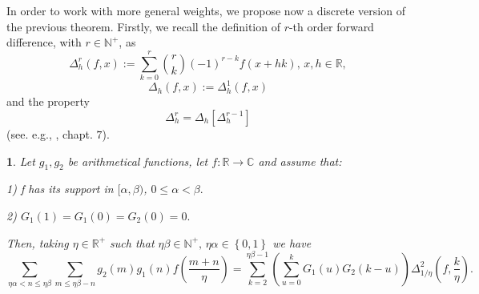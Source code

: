 \documentclass[10pt,a4paper]{amsart}
\numberwithin{equation}{section}
\numberwithin{figure}{section}
\newtheorem{thm}{\protect\theoremname}
\providecommand{\theoremname}{Theorem}
\begin{document}
In order to work with more general weights, we propose now a discrete
version of the previous theorem. Firstly, we recall the definition
of $r$-th order forward difference, with $r\in\mathbb{N}^{+}$, as
\[
\Delta_{h}^{r}\left(f,x\right):=\sum_{k=0}^{r}\binom{r}{k}\left(-1\right)^{r-k}f\left(x+hk\right),\,x,h\in\mathbb{R},
\]
\[
\Delta_{h}\left(f,x\right):=\Delta_{h}^{1}\left(f,x\right)
\]
and the property
\begin{equation}
\Delta_{h}^{r}=\Delta_{h}\left[\Delta_{h}^{r-1}\right]\label{eq:prod fow diff}
\end{equation}
(see. e.g., \cite{DVL1993}, chapt. $7$).
\begin{thm}
\label{thm:MainDiscrete}Let $g_{1},g_{2}$ be arithmetical functions,
let $f:\mathbb{R}\rightarrow\mathbb{C}$ and assume that:

1) f has its support in $[\alpha,\beta)$, $0\leq\alpha<\beta$$.$ 

2) $G_{1}(1)=G_{1}(0)=G_{2}(0)=0.$

Then, taking $\eta\in\mathbb{R}^{+}$ such that $\eta\beta\in\mathbb{N}^{+},\,\eta\alpha\in\left\{ 0,1\right\} $
we have
\[
\sum_{\eta\alpha<n\leq\eta\beta}\sum_{m\leq\eta\beta-n}g_{2}\left(m\right)g_{1}\left(n\right)f\left(\frac{m+n}{\eta}\right)=\sum_{k=2}^{\eta\beta-1}\left(\sum_{u=0}^{k}G_{1}\left(u\right)G_{2}\left(k-u\right)\right)\Delta_{1/\eta}^{2}\left(f,\frac{k}{\eta}\right).
\]
\end{thm}
\end{document}
